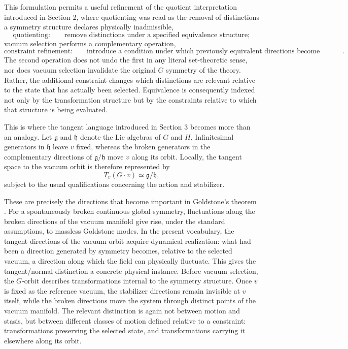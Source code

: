 \documentclass[11pt]{article}
\begin{document}
This formulation permits a useful refinement of the quotient interpretation introduced in Section 2, where quotienting was read as the removal of distinctions a symmetry structure declares physically inadmissible,
\[
\text{quotienting:} \qquad \text{remove distinctions under a specified equivalence structure};
\]
vacuum selection performs a complementary operation,
\[
\text{constraint refinement:} \qquad \text{introduce a condition under which previously equivalent directions become distinguishable}.
\]
The second operation does not undo the first in any literal set-theoretic sense, nor does vacuum selection invalidate the original $G$ symmetry of the theory. Rather, the additional constraint changes which distinctions are relevant relative to the state that has actually been selected. Equivalence is consequently indexed not only by the transformation structure but by the constraints relative to which that structure is being evaluated.

This is where the tangent language introduced in Section 3 becomes more than an analogy. Let $\mathfrak{g}$ and $\mathfrak{h}$ denote the Lie algebras of $G$ and $H$. Infinitesimal generators in $\mathfrak{h}$ leave $v$ fixed, whereas the broken generators in the complementary directions of $\mathfrak{g}/\mathfrak{h}$ move $v$ along its orbit. Locally, the tangent space to the vacuum orbit is therefore represented by
\[
T_v(G \cdot v) \simeq \mathfrak{g}/\mathfrak{h},
\]
subject to the usual qualifications concerning the action and stabilizer.

These are precisely the directions that become important in Goldstone's theorem \cite{Goldstone1961,GoldstoneSalamWeinberg1962}. For a spontaneously broken continuous global symmetry, fluctuations along the broken directions of the vacuum manifold give rise, under the standard assumptions, to massless Goldstone modes. In the present vocabulary, the tangent directions of the vacuum orbit acquire dynamical realization: what had been a direction generated by symmetry becomes, relative to the selected vacuum, a direction along which the field can physically fluctuate. This gives the tangent/normal distinction a concrete physical instance. Before vacuum selection, the $G$-orbit describes transformations internal to the symmetry structure. Once $v$ is fixed as the reference vacuum, the stabilizer directions remain invisible at $v$ itself, while the broken directions move the system through distinct points of the vacuum manifold. The relevant distinction is again not between motion and stasis, but between different classes of motion defined relative to a constraint: transformations preserving the selected state, and transformations carrying it elsewhere along its orbit.
\end{document}
